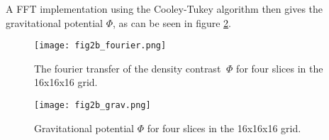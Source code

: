 A FFT implementation using the Cooley-Tukey algorithm then gives the gravitational potential $\Phi$, as can be seen in figure \ref{fig:gravitational_potential}.

\begin{figure}
    \centering
    \texttt{[image: fig2b\_fourier.png]}
    \caption{The fourier transfer of the density contrast $~\Phi$ for four slices in the 16x16x16 grid.}
    \label{fig:gravitational_potential}
\end{figure}

\begin{figure}
    \centering
    \texttt{[image: fig2b\_grav.png]}
    \caption{Gravitational potential $\Phi$ for four slices in the 16x16x16 grid.}
    \label{fig:gravitational_potential}
\end{figure}




